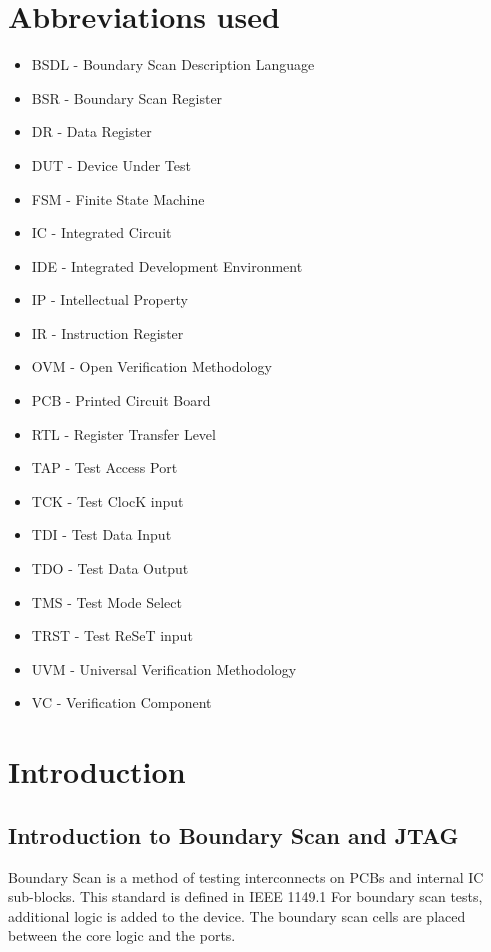 \documentclass[a4paper,11pt]{article}
\begin{document}
\section{Abbreviations used}
\begin{itemize}[noitemsep]
 \item BSDL - Boundary Scan Description Language
 \item BSR  - Boundary Scan Register
 \item DR   - Data Register
 \item DUT  - Device Under Test
 \item FSM  - Finite State Machine
 \item IC   - Integrated Circuit 
 \item IDE  - Integrated Development Environment
 \item IP   - Intellectual Property
 \item IR   - Instruction Register
 \item OVM  - Open Verification Methodology
 \item PCB  - Printed Circuit Board
 \item RTL  - Register Transfer Level
 \item TAP  - Test Access Port
 \item TCK  - Test ClocK input
 \item TDI  - Test Data Input
 \item TDO  - Test Data Output
 \item TMS  - Test Mode Select
 \item TRST - Test ReSeT input
 \item UVM  - Universal Verification Methodology
 \item VC   - Verification Component 
\end{itemize}


\newpage
\pagebreak
\section{Introduction}

\subsection{Introduction to Boundary Scan and JTAG}
Boundary Scan is a method of testing interconnects on PCBs and internal IC sub-blocks. This standard is defined in IEEE 1149.1
For boundary scan tests, additional logic is added to the device. The boundary scan cells are placed between the core logic and the ports.
\end{document}
